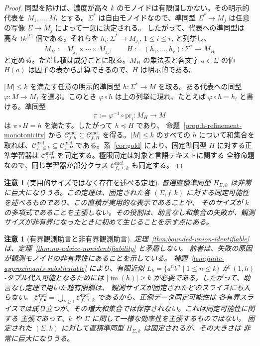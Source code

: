 \documentclass[11pt,a4paper]{ltjsarticle}
\newtheorem{remark}[theorem]{注意}
\theoremstyle{remark}
\newcommand{\Cmcf}[2]{\mathcal{C}^{\mathrm{mcf}}_{#1,#2}}
\begin{document}
\begin{proof}
同型を除けば、濃度が高々 \(k\) のモノイドは有限個しかない。その明示的代表を
\(M_1,\ldots,M_t\) とする。\(\Sigma^*\) は自由モノイドなので、準同型
\(\Sigma^*\to M_j\) は任意の写像 \(\Sigma\to M_j\) によって一意に決定される。
したがって、代表への準同型は高々 \(t k^{|\Sigma|}\) 個である。それらを
\(h_i:\Sigma^*\to M_{j_i}\), \(1\le i\le r\), と列挙し、
\[
  M_H:=M_{j_1}\times\cdots\times M_{j_r},
  \qquad
  H:=(h_1,\ldots,h_r):\Sigma^*\to M_H
\]
と定める。ただし積は成分ごとに取る。\(M_H\) の乗法表と各文字 \(a\in\Sigma\) の値
\(H(a)\) は因子の表から計算できるので、\(H\) は明示的である。

\(|M|\le k\) を満たす任意の明示的準同型 \(h:\Sigma^*\to M\) を取る。ある代表への同型
\(\varphi:M\to M_j\) を選ぶ。このとき \(\varphi\circ h\) は上の列挙に現れ、たとえば
\(\varphi\circ h=h_i\) と書ける。準同型
\[
  \pi:=\varphi^{-1}\circ\mathrm{pr}_i:M_H\to M
\]
は \(\pi\circ H=h\) を満たす。したがって \(h\preceq H\) であり、
命題~\ref{prop:h-refinement-monotonicity} から
\(\Cmcf{f}{h}\subseteq\Cmcf{f}{H}\) を得る。\(|M|\le k\) のすべての \(h\) について和集合を
取れば、\(\Cmcf{f}{\le k}\subseteq\Cmcf{f}{H}\) である。系~\ref{cor:gold} により、固定準同型
\(H\) に対する正準学習器は \(\Cmcf{f}{H}\) を同定する。極限同定は対象と言語テキストに関する
全称命題なので、同じ学習器が部分クラス \(\Cmcf{f}{\le k}\) も同定する。
\end{proof}

\begin{remark}[実用的サイズではなく存在を述べる定理]
\label{rem:universal-product-size}
普遍直積準同型 \(H_{\Sigma,k}\) は非常に巨大になりうる。この定理は、固定された各
\((\Sigma,f,k)\) に対する同定可能性を述べるものであり、この直積が実用的な表示であることや、
そのサイズが \(k\) の多項式であることを主張しない。その役割は、助言なし和集合の失敗が、観測
サイズが非有界になったときに初めて生じることを示す点にある。
\end{remark}

\begin{remark}[有界観測助言と非有界観測助言]
\label{rem:bounded-vs-unbounded-union}
定理~\ref{thm:bounded-union-identifiable} は、定理~\ref{thm:no-advice-nonidentifiability} と矛盾しない。
前者は、失敗の原因が観測モノイドの非有界性にあることを示している。
補題~\ref{lem:finite-approximants-substitutable} により、有限近似
\(L_k=\{a^n b^n\mid 1\le n\le k\}\) が \((1,h)\)-タプル代入可能となるためには
\(|\operatorname{im}(h)|\ge k\) が必要である。したがって、助言なし定理で用いた超有限鎖は、
観測サイズが固定されたどのスライスにも入らない。
\(\Cmcf{f}{\bullet}=\bigcup_{k\ge1}\Cmcf{f}{\le k}\) であるから、正例データ同定可能性は
各有界スライスでは成り立つが、その増大和集合では保存されない。これは同定可能性に関する
主張であって、\(k\) や \(\Sigma\) に関して一様な効率性を主張するものではない。
固定された \((\Sigma,k)\) に対して直積準同型 \(H_{\Sigma,k}\) は固定されるが、その大きさは
非常に巨大になりうる。
\end{remark}
\end{document}
